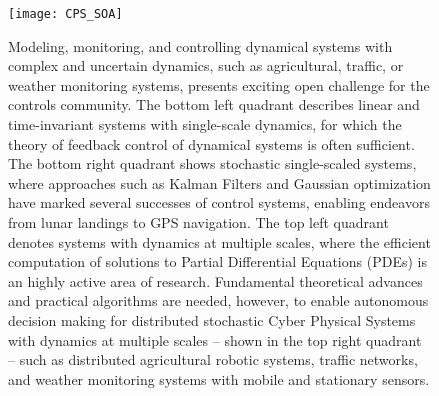 % 
% 

\begin{figure}[h] %
	\centering
	\texttt{[image: CPS\_SOA]}
		\caption{Modeling, monitoring, and controlling dynamical systems with complex and uncertain dynamics, such as agricultural, traffic, or weather monitoring systems, presents exciting open challenge for the controls community. The bottom left quadrant describes linear and time-invariant systems with single-scale dynamics, for which the theory of feedback control of dynamical systems is often sufficient. The bottom right quadrant shows stochastic single-scaled systems, where approaches such as Kalman Filters and Gaussian optimization have marked several successes of control systems, enabling endeavors from lunar landings to GPS navigation. The top left quadrant denotes systems with dynamics at multiple scales, where the efficient computation of solutions to Partial Differential Equations (PDEs) is an highly active area of research. Fundamental theoretical advances and practical algorithms are needed, however, to enable autonomous decision making for distributed stochastic Cyber Physical Systems with dynamics at multiple scales – shown in the top right quadrant – such as distributed agricultural robotic systems, traffic networks, and weather monitoring systems with mobile and stationary sensors.}
	\label{fig:cps_soa}
\end{figure}
  
